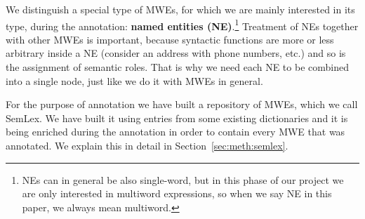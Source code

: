 We distinguish a special type of MWEs, for which we are mainly interested in its type, during the annotation: \textbf{named entities (NE)}.\footnote{NEs can in general be also single-word, but in this phase of our project we are only interested in multiword expressions, so when we say NE in this paper, we always mean multiword.} 
%
Treatment of NEs together with other MWEs is important, because syntactic functions
are more or less arbitrary inside a NE (consider an address with phone numbers, etc.) and so is the assignment of semantic roles.
That is why we need each NE to be combined into a single node, just like we do it with MWEs in general. 


For the purpose of annotation we have built a repository of MWEs, which we call SemLex. We have built it using entries from some existing dictionaries and it is being enriched during the annotation in order to contain every MWE that was annotated. We explain this in detail in Section~\ref{sec:meth:semlex}. 


